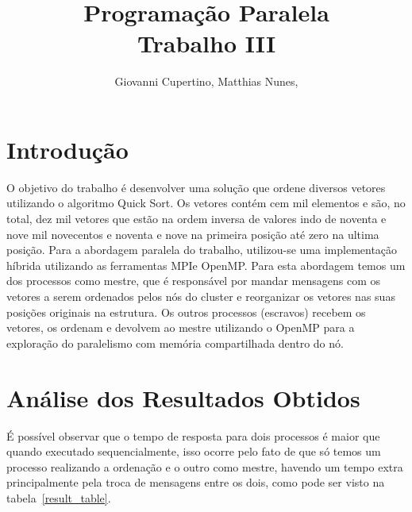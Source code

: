\documentclass[11pt]{IEEEtran}
\title{Programação Paralela\\ Trabalho III}
\author{Giovanni Cupertino, Matthias Nunes, \IEEEmembership{Usuário pp12820}}
\begin{document}
\maketitle

\section{Introdução}

	O objetivo do trabalho é desenvolver uma solução que ordene diversos vetores
	utilizando o algoritmo Quick Sort.  Os vetores contém cem mil elementos e
	são, no total, dez mil vetores que estão na ordem inversa de valores indo de
	noventa e nove mil novecentos e noventa e nove na primeira posição até zero
	na ultima posição.  Para a abordagem paralela do trabalho, utilizou-se uma
	implementação híbrida utilizando as ferramentas MPI\@ e OpenMP. Para esta 
	abordagem temos um dos processos como mestre, que é responsável por mandar 
	mensagens com os vetores a serem ordenados pelos nós do cluster e reorganizar
	os vetores nas suas posições originais na estrutura. Os outros processos 
	(escravos) recebem os vetores, os ordenam e devolvem ao mestre utilizando o 
	OpenMP para a exploração do paralelismo com memória compartilhada dentro do nó.

\section{Análise dos Resultados Obtidos}

	É possível observar que o tempo de resposta para dois
	processos é maior que quando executado sequencialmente, isso ocorre pelo
	fato de que só temos um processo realizando a ordenação e o outro como
	mestre, havendo um tempo extra principalmente pela troca de mensagens entre
	os dois, como pode ser visto na tabela~\ref{result_table}.
\end{document}
